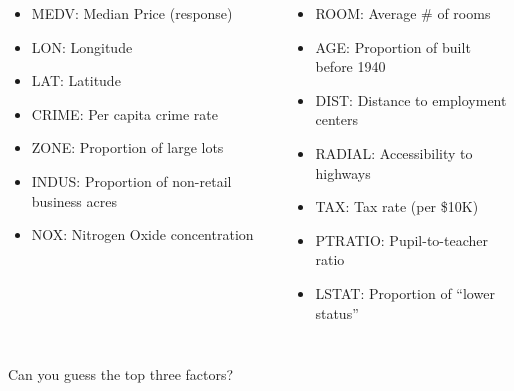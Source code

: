 \documentclass{beamer}\usepackage[]{graphicx}\usepackage[]{color}
\makeatletter
\newcommand{\hlstr}[1]{\textcolor[rgb]{1,0.894,0.71}{#1}}%
\newcommand{\hlopt}[1]{\textcolor[rgb]{1,0.894,0.769}{#1}}%
\newcommand{\hlstd}[1]{\textcolor[rgb]{1,0.894,0.769}{#1}}%
\newcommand{\hlkwc}[1]{\textcolor[rgb]{0.78,0.941,0.545}{#1}}%
\newcommand{\hlkwd}[1]{\textcolor[rgb]{1,0.78,0.769}{#1}}%
\newenvironment{kframe}{%
 \def\at@end@of@kframe{}%
 \ifinner\ifhmode%
  \def\at@end@of@kframe{\end{minipage}}%
  \begin{minipage}{\columnwidth}%
 \fi\fi%
 \def\FrameCommand##1{\hskip\@totalleftmargin \hskip-\fboxsep
 \colorbox{shadecolor}{##1}\hskip-\fboxsep
     \hskip-\linewidth \hskip-\@totalleftmargin \hskip\columnwidth}%
 \MakeFramed {\advance\hsize-\width
   \@totalleftmargin\z@ \linewidth\hsize
   \@setminipage}}%
 {\par\unskip\endMakeFramed%
 \at@end@of@kframe}
\newenvironment{knitrout}{}{} %
\makeatother
\begin{document}
\begin{darkframes}
\begin{frame}
      \begin{columns}[onlytextwidth]
          \begin{itemize}
            \item MEDV: Median Price (response)
            \item LON: Longitude
            \item LAT: Latitude
            \item CRIME: Per capita crime rate
            \item ZONE: Proportion of large lots
            \item INDUS: Proportion of non-retail business acres
            \item NOX: Nitrogen Oxide concentration
          \end{itemize}
          \begin{itemize}
            \item ROOM: Average \# of rooms
            \item AGE: Proportion of built before 1940
            \item DIST: Distance to employment centers
            \item RADIAL: Accessibility to highways
            \item TAX: Tax rate (per \$10K)
            \item PTRATIO: Pupil-to-teacher ratio
            \item LSTAT: Proportion of ``lower status''
          \end{itemize}
      \end{columns}

    \end{frame}





    \begin{frame}
        Can you guess the top three factors?
        \lc
    \end{frame}




\end{darkframes}
\end{document}

